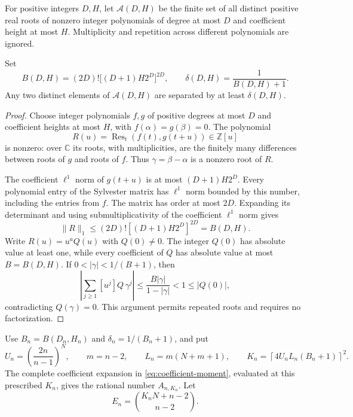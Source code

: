 For positive integers $D,H$, let $\mathcal A(D,H)$ be the finite set
of all distinct positive real roots of nonzero integer polynomials of
degree at most $D$ and coefficient height at most $H$.
Multiplicity and repetition across different polynomials are ignored.

\begin{lemma}
\label{lem:universal-resultant-separation}
Set
\[
 B(D,H)=(2D)!\bigl[(D+1)H2^D\bigr]^{2D},\qquad
 \delta(D,H)=\frac1{B(D,H)+1}.
\]
Any two distinct elements of $\mathcal A(D,H)$ are separated by at
least $\delta(D,H)$.
\end{lemma}
\begin{proof}
Choose integer polynomials $f,g$ of positive degrees at most $D$ and
coefficient heights at most $H$, with $f(\alpha)=g(\beta)=0$.
The polynomial
\[
 R(u)=\operatorname{Res}_t(f(t),g(t+u))\in\mathbb Z[u]
\]
is nonzero: over $\mathbb C$ its roots, with multiplicities, are the
finitely many differences between roots of $g$ and roots of $f$.
Thus $\gamma=\beta-\alpha$ is a nonzero root of $R$.

The coefficient $\ell^1$ norm of $g(t+u)$ is at most
$(D+1)H2^D$. Every polynomial entry of the Sylvester matrix has
$\ell^1$ norm bounded by this number, including the entries from $f$.
The matrix has order at most $2D$. Expanding its determinant and using
submultiplicativity of the coefficient $\ell^1$ norm gives
\[
 \|R\|_1\le(2D)![(D+1)H2^D]^{2D}=B(D,H).
\]
Write $R(u)=u^aQ(u)$ with $Q(0)\ne0$. The integer $Q(0)$ has
absolute value at least one, while every coefficient of $Q$ has
absolute value at most $B=B(D,H)$. If $0<|\gamma|<1/(B+1)$, then
\[
 \left|\sum_{j\ge1}[u^j]Q\,\gamma^j\right|
 \le\frac{B|\gamma|}{1-|\gamma|}<1\le|Q(0)|,
\]
contradicting $Q(\gamma)=0$.
This argument permits repeated roots and requires no factorization.
\end{proof}

Use $B_n=B(D_n,H_n)$ and $\delta_n=1/(B_n+1)$, and put
\begin{equation}\label{eq:explicit-fixed-moment-order}
 U_n=\left(\frac{2n}{n-1}\right)^N,\qquad
 m=n-2,\qquad L_n=m(N+m+1),\qquad
 K_n=\left\lceil4U_nL_n(B_n+1)\right\rceil^2.
\end{equation}
The complete coefficient expansion in
\eqref{eq:coefficient-moment}, evaluated at this prescribed $K_n$,
gives the rational number $A_{n,K_n}$. Let
\[
 E_n=\binom{K_nN+n-2}{n-2}.
\]

